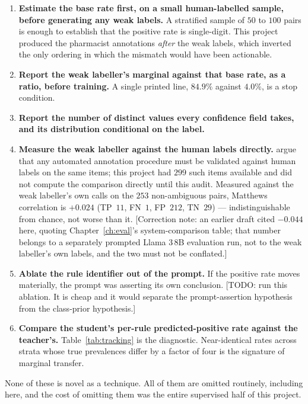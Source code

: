 \begin{enumerate}
\item \textbf{Estimate the base rate first, on a small human-labelled sample,
      before generating any weak labels.} A stratified sample of $50$ to $100$
      pairs is enough to establish that the positive rate is single-digit.
      This project produced the pharmacist annotations \emph{after} the weak
      labels, which inverted the only ordering in which the mismatch would have
      been actionable.
\item \textbf{Report the weak labeller's marginal against that base rate, as a
      ratio, before training.} A single printed line, $84.9\%$ against $4.0\%$,
      is a stop condition.
\item \textbf{Report the number of distinct values every confidence field takes,
      and its distribution conditional on the label.}
\item \textbf{Measure the weak labeller against the human labels directly.}
      \citet{pangakis2023validation} argue that any automated annotation
      procedure must be validated against human labels on the same items; this
      project had $299$ such items available and did not compute the
      comparison directly until this audit. Measured against the weak
      labeller's own calls on the $253$ non-ambiguous pairs, Matthews
      correlation is $+0.024$ (TP~$11$, FN~$1$, FP~$212$, TN~$29$) ---
      indistinguishable from chance, not worse than it. [Correction note: an
      earlier draft cited $-0.044$ here, quoting Chapter~\ref{ch:eval}'s
      system-comparison table; that number belongs to a separately prompted
      Llama 3\,8B evaluation run, not to the weak labeller's own labels, and
      the two must not be conflated.]
\item \textbf{Ablate the rule identifier out of the prompt.} If the positive
      rate moves materially, the prompt was asserting its own conclusion.
      [TODO: run this ablation. It is cheap and it would separate the
      prompt-assertion hypothesis from the class-prior hypothesis.]
\item \textbf{Compare the student's per-rule predicted-positive rate against the
      teacher's.} Table~\ref{tab:tracking} is the diagnostic. Near-identical
      rates across strata whose true prevalences differ by a factor of four is
      the signature of marginal transfer.
\end{enumerate}

None of these is novel as a technique. All of them are omitted routinely,
including here, and the cost of omitting them was the entire supervised half of
this project.

